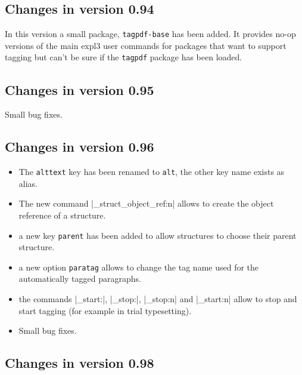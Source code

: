\documentclass[DIV=12,parskip=half-,bibliography=totoc,a4paper]{article}
\newcommand\pkg[1]{\texttt{#1}}
\begin{document}
\subsection{Changes in version 0.94}

In this version a small package, \pkg{tagpdf-base} has been added. It provides
no-op versions of the main expl3 user commands for packages that want to support
tagging but can't be sure if the \pkg{tagpdf} package has been loaded.

\subsection{Changes in version 0.95}

Small bug fixes.

\subsection{Changes in version 0.96}

\begin{itemize}
\item The \texttt{alttext} key has been renamed to \texttt{alt}, the other key name exists as alias.

\item The new command |\tag_struct_object_ref:n| allows to
   create the object reference of a structure.

\item a new key \texttt{parent} has been added
   to allow structures to choose their parent structure.

\item a new option \texttt{paratag} allows to change the tag name used for the
   automatically tagged paragraphs.

\item the commands |\tag_start:|, |\tag_stop:|, |\tag_stop:n| and |\tag_start:n| allow
    to stop and start tagging (for example in trial typesetting).

\item Small bug fixes.
\end{itemize}

\subsection{Changes in version 0.98}
\end{document}
